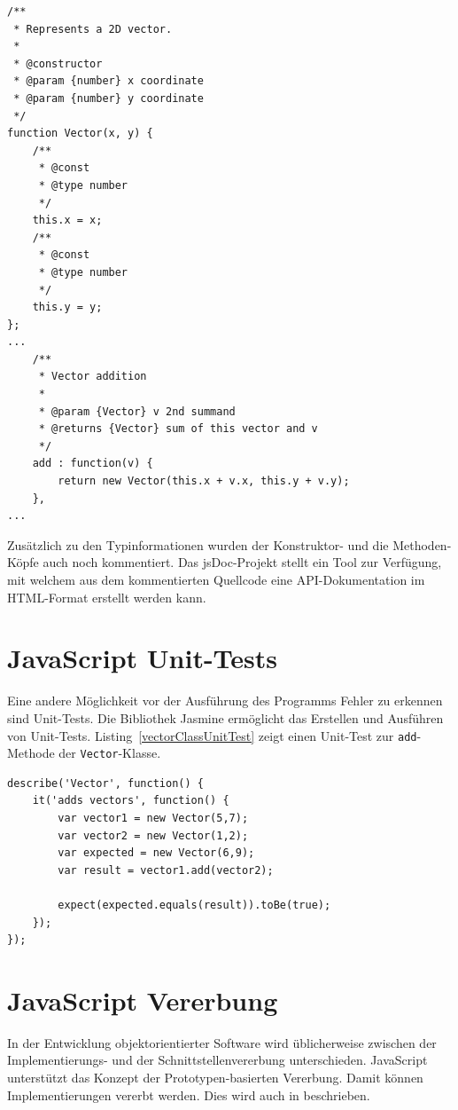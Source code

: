 \begin{lstlisting}[float = htbp, caption={Eine Vektor-Klasse mit Typinformationen},label=vectorClassTypes]
/**
 * Represents a 2D vector.
 * 
 * @constructor
 * @param {number} x coordinate
 * @param {number} y coordinate
 */
function Vector(x, y) {
    /**
     * @const
     * @type number
     */
    this.x = x;
    /**
     * @const
     * @type number
     */
    this.y = y;    
};
...
    /**
     * Vector addition
     * 
     * @param {Vector} v 2nd summand
     * @returns {Vector} sum of this vector and v
     */
    add : function(v) {
        return new Vector(this.x + v.x, this.y + v.y);
    },
...
\end{lstlisting}

Zusätzlich zu den Typinformationen wurden der Konstruktor- und die Methoden-Köpfe auch noch kommentiert. Das jsDoc-Projekt stellt ein Tool \autocite{jsDoc} zur Verfügung, mit welchem aus dem kommentierten Quellcode eine API-Dokumentation im HTML-Format erstellt werden kann.

\section*{JavaScript Unit-Tests} 

Eine andere Möglichkeit vor der Ausführung des Programms Fehler zu erkennen sind Unit-Tests. Die Bibliothek Jasmine \autocite{jasmine} ermöglicht das Erstellen und Ausführen von Unit-Tests. Listing~\ref{vectorClassUnitTest} zeigt einen Unit-Test zur \verb+add+-Methode der \verb+Vector+-Klasse.

\begin{lstlisting}[float = htbp, caption={Ein Unit-Test zur Vektoraddition},label=vectorClassUnitTest]
describe('Vector', function() {
    it('adds vectors', function() {
        var vector1 = new Vector(5,7);
        var vector2 = new Vector(1,2);
        var expected = new Vector(6,9);
        var result = vector1.add(vector2);
        
        expect(expected.equals(result)).toBe(true);
    });
});
\end{lstlisting}


\section*{JavaScript Vererbung}

In der Entwicklung objektorientierter Software wird üblicherweise zwischen der Implementierungs- und der Schnittstellenvererbung unterschieden. JavaScript unterstützt das Konzept der Prototypen-basierten Vererbung. Damit können Implementierungen vererbt werden. Dies wird auch in \autocite{Flanagan2011} beschrieben. 


